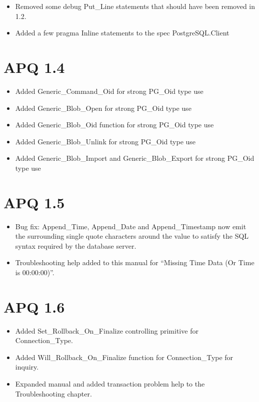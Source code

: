 \documentclass[english,letterpaper]{book}
\begin{document}
\begin{itemize}
   \item Removed some debug Put\_Line statements that should have been removed
         in 1.2.
   \item Added a few pragma Inline statements to the spec PostgreSQL.Client
\end{itemize}

\section*{APQ 1.4}

\begin{itemize}
   \item Added Generic\_Command\_Oid for strong PG\_Oid type use
   \item Added Generic\_Blob\_Open for strong PG\_Oid type use
   \item Added Generic\_Blob\_Oid function for strong PG\_Oid type use
   \item Added Generic\_Blob\_Unlink for strong PG\_Oid type use
   \item Added Generic\_Blob\_Import and Generic\_Blob\_Export for strong PG\_Oid
         type use
\end{itemize}

\section*{APQ 1.5}

\begin{itemize}
   \item Bug fix: Append\_Time, Append\_Date and Append\_Timestamp now emit
         the surrounding single quote characters around the value to satisfy
         the SQL syntax required by the database server.
   \item Troubleshooting help added to this manual for {}``Missing Time Data
         (Or Time is 00:00:00)''.
\end{itemize}

\section*{APQ 1.6}

\begin{itemize}
   \item Added Set\_Rollback\_On\_Finalize controlling primitive for Connection\_Type.
   \item Added Will\_Rollback\_On\_Finalize function for Connection\_Type for
         inquiry.
   \item Expanded manual and added transaction problem help to the Troubleshooting
         chapter.
\end{itemize}
\end{document}
